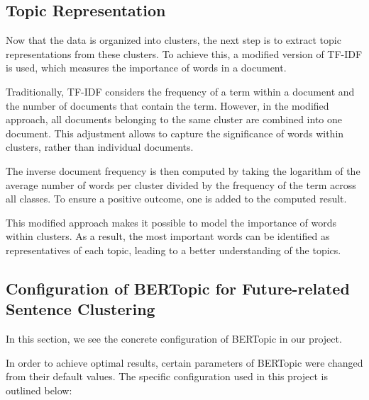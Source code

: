 \documentclass[12pt,oneside,bibtotoc,liststotoc]{scrbook}
\begin{document}
\subsection{Topic Representation}
Now that the data is organized into clusters, the next step is to extract topic representations from these clusters. To achieve this, a modified version of TF-IDF is used, which measures the importance of words in a document.

Traditionally, TF-IDF considers the frequency of a term within a document and the number of documents that contain the term. However, in the modified approach, all documents belonging to the same cluster are combined into one document. This adjustment allows to capture the significance of words within clusters, rather than individual documents.

The inverse document frequency is then computed by taking the logarithm of the average number of words per cluster divided by the frequency of the term across all classes. To ensure a positive outcome, one is added to the computed result.

This modified approach makes it possible to model the importance of words within clusters. As a result, the most important words can be identified as representatives of each topic, leading to a better understanding of the topics. \cite{bertopic}

\subsection{Configuration of BERTopic for Future-related Sentence Clustering}
\label{bertopic_config}
In this section, we see the concrete configuration of BERTopic in our project.

In order to achieve optimal results, certain parameters of BERTopic were changed from their default values. The specific configuration used in this project is outlined below:
\end{document}
